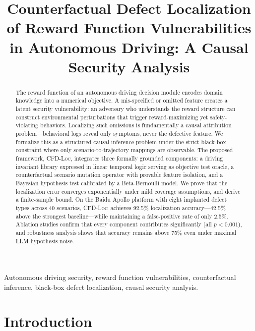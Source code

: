\documentclass[journal]{IEEEtran}
\title{Counterfactual Defect Localization of Reward Function Vulnerabilities in Autonomous Driving: A Causal Security Analysis}
\author{
\IEEEauthorblockN{\textbf{Wenjia Niu}}
\IEEEauthorblockA{School of Cyberspace Science and Technology\\
Beijing Jiaotong University, Beijing, China 100044\\
Email: Niuwj@bjtu.edu.cn}
}
\theoremstyle{plain}
\newcommand{\methodname}{\textsc{CFD-Loc}}
\begin{document}
\maketitle

\begin{abstract}
\noindent
The reward function of an autonomous driving decision module encodes domain knowledge into a numerical objective. A mis-specified or omitted feature creates a latent security vulnerability: an adversary who understands the reward structure can construct environmental perturbations that trigger reward-maximizing yet safety-violating behaviors. Localizing such omissions is fundamentally a causal attribution problem---behavioral logs reveal only symptoms, never the defective feature. We formalize this as a structured causal inference problem under the strict black-box constraint where only scenario-to-trajectory mappings are observable. The proposed framework, \methodname, integrates three formally grounded components: a driving invariant library expressed in linear temporal logic serving as objective test oracle, a counterfactual scenario mutation operator with provable feature isolation, and a Bayesian hypothesis test calibrated by a Beta-Bernoulli model. We prove that the localization error converges exponentially under mild coverage assumptions, and derive a finite-sample bound. On the Baidu Apollo platform with eight implanted defect types across 40 scenarios, \methodname\ achieves 92.5\% localization accuracy---42.5\% above the strongest baseline---while maintaining a false-positive rate of only 2.5\%. Ablation studies confirm that every component contributes significantly (all $p<0.001$), and robustness analysis shows that accuracy remains above 75\% even under maximal LLM hypothesis noise.
\end{abstract}

\begin{IEEEkeywords}
Autonomous driving security, reward function vulnerabilities, counterfactual inference, black-box defect localization, causal security analysis.
\end{IEEEkeywords}

\section{Introduction}
\end{document}

